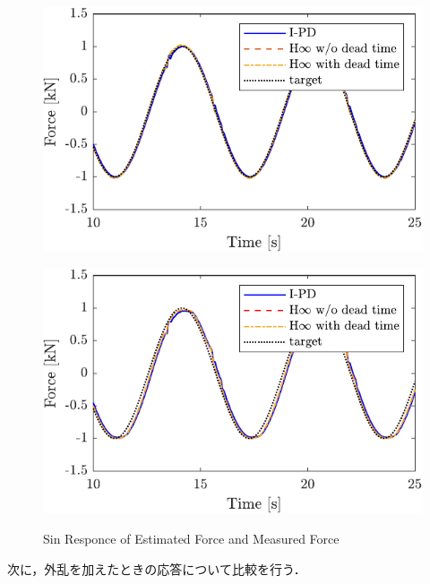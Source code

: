 \begin{figure}[t]
    \begin{minipage}{\minipageratio\hsize}
    \centering
        \includegraphics[keepaspectratio, width = \minifigwidth]{contents/ForceControl/figure/1115/crop-1115_diff_estforce_sin.pdf}
        \label{fig4:crop-1115_diff_estforce_sin}
    \end{minipage}
    \begin{minipage}{\minipageratio\hsize}
    \centering
        \includegraphics[keepaspectratio, width = \minifigwidth]{contents/ForceControl/figure/1115/crop-1115_diff_force_sin.pdf}
        \label{fig4:crop-1115_diff_force_sin}
    \end{minipage}
    \caption{Sin Responce of Estimated Force and Measured Force}
    \label{fig4:crop-1115_diff_sin}
\end{figure}

次に，外乱を加えたときの応答について比較を行う．